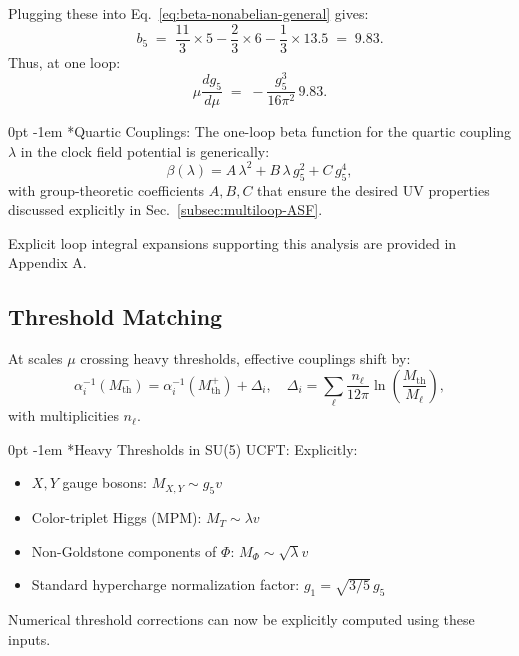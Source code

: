 \documentclass[aps,prd,preprint,groupedaddress]{revtex4-2}
\makeatletter
\renewcommand{\paragraph}[1]{%
  \@startsection{paragraph}{4}{\z@}%
    {0pt}%
    {-1em}%
    {\normalfont\normalsize\itshape}*{#1}}
\makeatother
\begin{document}
Plugging these into Eq.~\eqref{eq:beta-nonabelian-general} gives:
\begin{equation}
b_5 \;=\; \frac{11}{3}\times 5 - \frac{2}{3}\times 6 - \frac{1}{3}\times 13.5 \;=\; 9.83.
\end{equation}
Thus, at one loop:
\begin{equation}
\mu \frac{d g_5}{d\mu} \;=\; -\frac{g_5^3}{16\pi^2}\,9.83.
\end{equation}

\paragraph{Quartic Couplings:}
The one-loop beta function for the quartic coupling \(\lambda\) in the clock field potential is generically:
\begin{equation}
\beta(\lambda)=A\,\lambda^2+B\,\lambda\,g_5^2+C\,g_5^4,
\end{equation}
with group-theoretic coefficients \(A,B,C\) that ensure the desired UV properties discussed explicitly in Sec.~\ref{subsec:multiloop-ASF}.

Explicit loop integral expansions supporting this analysis are provided in Appendix A.

\subsection{Threshold Matching}
\label{subsec:threshold}

At scales \(\mu\) crossing heavy thresholds, effective couplings shift by:
\begin{equation}
\alpha_i^{-1}(M_{\mathrm{th}}^-)=\alpha_i^{-1}(M_{\mathrm{th}}^+)+\Delta_i,
\quad
\Delta_i=\sum_{\ell}\frac{n_\ell}{12\pi}\ln\!\left(\frac{M_{\mathrm{th}}}{M_\ell}\right),
\end{equation}
with multiplicities \(n_\ell\).

\paragraph{Heavy Thresholds in SU(5) UCFT:}
Explicitly:
\begin{itemize}
\item \(X,Y\) gauge bosons: \(M_{X,Y}\sim g_5 v\)
\item Color-triplet Higgs (MPM): \(M_{T}\sim \lambda v\)
\item Non-Goldstone components of \(\Phi\): \(M_{\Phi}\sim\sqrt{\lambda}v\)
\item Standard hypercharge normalization factor: \(g_1=\sqrt{3/5}\,g_5\)
\end{itemize}
Numerical threshold corrections can now be explicitly computed using these inputs.
\end{document}
